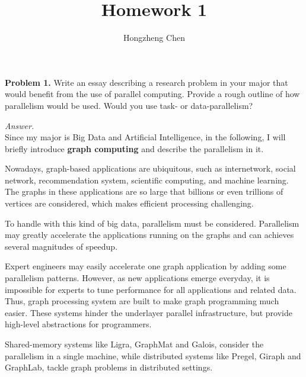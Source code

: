 \documentclass[english]{thesis}
\title{Homework 1}
\author{Hongzheng Chen}
\begin{document}
\maketitle

\textbf{Problem 1.} Write an essay describing a research problem in your major that would benefit from the use of parallel computing.
Provide a rough outline of how parallelism would be used.
Would you use task- or data-parallelism?
\bigskip

\textit{Answer.}\\
Since my major is Big Data and Artificial Intelligence, in the following, I will briefly introduce \textbf{graph computing} and describe the parallelism in it.

\bigskip
Nowadays, graph-based applications are ubiquitous, such as internetwork\cite{bib:pagerank}, social network\cite{bib:social_network}, recommendation system\cite{bib:rs}, scientific computing\cite{bib:epidemic}, and machine learning\cite{bib:ml}.
The graphs in these applications are so large that billions or even trillions of vertices are considered\cite{bib:graph500}, which makes efficient processing challenging.

To handle with this kind of big data, parallelism must be considered.
Parallelism may greatly accelerate the applications running on the graphs and can achieves several magnitudes of speedup.

Expert engineers may easily accelerate one graph application by adding some parallelism patterns.
However, as new applications emerge everyday, it is impossible for experts to tune performance for all applications and related data.
Thus, graph processing system are built to make graph programming much easier.
These systems hinder the underlayer parallel infrastructure, but provide high-level abstractions for programmers.

Shared-memory systems like Ligra\cite{bib:ligra}, GraphMat\cite{bib:graphmat} and Galois\cite{bib:galois}, consider the parallelism in a single machine, while distributed systems like Pregel\cite{bib:pregel}, Giraph\cite{bib:giraph} and GraphLab\cite{bib:graphlab}, tackle graph problems in distributed settings.
\end{document}
